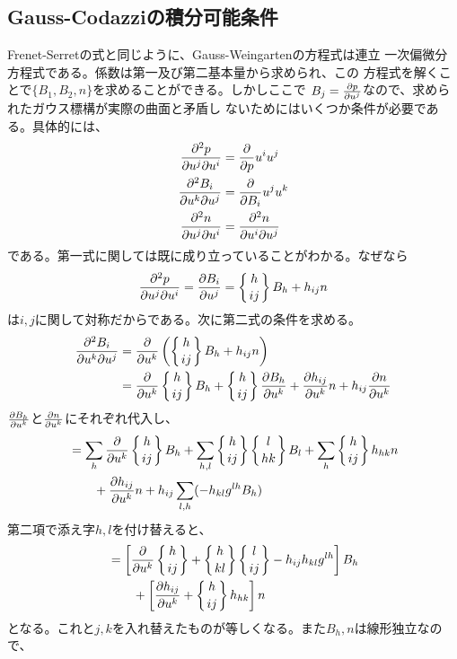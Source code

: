         \subsection{Gauss-Codazziの積分可能条件}
            Frenet-Serretの式と同じように、Gauss-Weingartenの方程式は連立
            一次偏微分方程式である。係数は第一及び第二基本量から求められ、この
            方程式を解くことで$\{B_1,B_2,n\}$を求めることができる。しかしここで
            $B_j=\pd[p]{u^j}$なので、求められたガウス標構が実際の曲面と矛盾し
            ないためにはいくつか条件が必要である。具体的には、
            \begin{align*}
                \ppd{p}{u^j}{u^i} &= \pd{p}{u^i}{u^j}\\
                \ppd{B_i}{u^k}{u^j} &= \pd{B_i}{u^j}{u^k}\\
                \ppd{n}{u^j}{u^i} &= \ppd{n}{u^i}{u^j}
            \end{align*}
            である。第一式に関しては既に成り立っていることがわかる。なぜなら
                \[\ppd{p}{u^j}{u^i} = \pd[B_i]{u^j}
                = \chr{h}{ij}B_h + h_{ij}n\]
            は$i,j$に関して対称だからである。次に第二式の条件を求める。
            \begin{align*}
                \ppd{B_i}{u^k}{u^j}
                &= \pd{u^k}\lr{\chr{h}{ij}B_h + h_{ij}n}\\
                &= \pd{u^k}\chr{h}{ij}B_h + \chr{h}{ij}\pd[B_h]{u^k}
                + \pd[h_{ij}]{u^k}n + h_{ij}\pd[n]{u^k}
            \end{align*}
            $\pd[B_h]{u^k}$と$\pd[n]{u^k}$にそれぞれ代入し、
            \begin{align*}
                & = \sum_h\pd{u^k}\chr{h}{ij}B_h
                + \sum_{h,l}\chr{h}{ij}\chr{l}{hk}B_l + \sum_h\chr{h}{ij}h_{hk}n\\
                &\qquad + \pd[h_{ij}]{u^k}n+h_{ij}\sum_{l,h}(-h_{kl}g^{lh}B_h)\\
            \end{align*}
            第二項で添え字$h,l$を付け替えると、
            \begin{align*}
                &= \llr{\pd{u^k}\chr{h}{ij}
                +\chr{h}{kl}\chr{l}{ij} - h_{ij}h_{kl}g^{lh}}B_h\\
                &\qquad + \llr{\pd[h_{ij}]{u^k} + \chr{h}{ij}h_{hk}}n\\
            \end{align*}
            となる。これと$j,k$を入れ替えたものが等しくなる。また$B_h,n$は線形独立なので、
